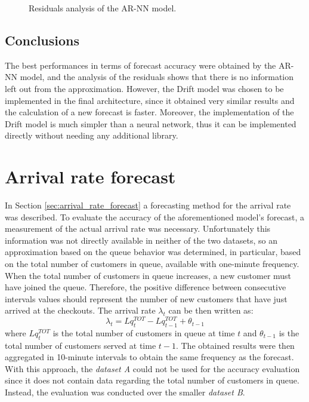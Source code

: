 \begin{figure}
  \begin{center}
  \end{center}
  \caption{Residuals analysis of the AR-NN model.}
  \label{fig:inflow_rate_forecast_residuals}
\end{figure}

\subsection{Conclusions}
\label{subsec:inflow_rate_forecast_results_conclusions}

The best performances in terms of forecast accuracy were obtained by the AR-NN model, and the analysis of the residuals shows that there is no information left out from the approximation. However, the Drift model was chosen to be implemented in the final architecture, since it obtained very similar results and the calculation of a new forecast is faster. Moreover, the implementation of the Drift model is much simpler than a neural network, thus it can be implemented directly without needing any additional library.

\section{Arrival rate forecast}
\label{sec:arrival_rate_forecast_results}

In Section \ref{sec:arrival_rate_forecast} a forecasting method for the arrival rate was described. To evaluate the accuracy of the aforementioned model’s forecast, a measurement of the actual arrival rate was necessary. Unfortunately this information was not directly available in neither of the two datasets, so an approximation based on the queue behavior was determined, in particular, based on the total number of customers in queue, available with one-minute frequency. When the total number of customers in queue increases, a new customer must have joined the queue. Therefore, the positive difference between consecutive intervals values should represent the number of new customers that have just arrived at the checkouts. The arrival rate \( \lambda_t \) can be then written as:
\begin{equation}
  \lambda_t = Lq_t^{TOT} - Lq_{t-1}^{TOT} + \theta_{t-1}
\end{equation}
where \( Lq_t^{TOT} \) is the total number of customers in queue at time \( t \) and \( \theta_{t-1} \) is the total number of customers served at time \( t-1 \). The obtained results were then aggregated in 10-minute intervals to obtain the same frequency as the forecast. With this approach, the \emph{dataset A} could not be used for the accuracy evaluation since it does not contain data regarding the total number of customers in queue. Instead, the evaluation was conducted over the smaller \emph{dataset B}.

